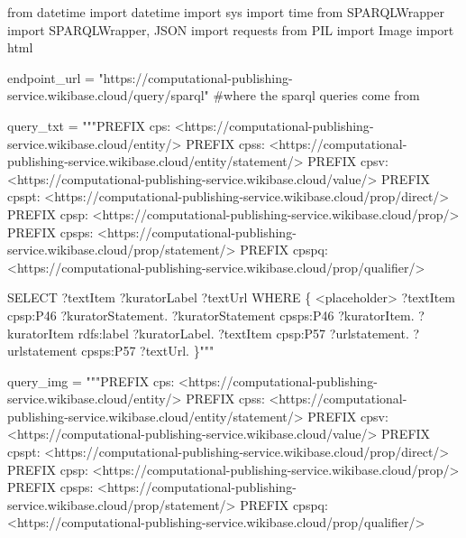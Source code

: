 \documentclass[
  letterpaper,
]{book}
\newenvironment{Shaded}{\begin{snugshade}}{\end{snugshade}}
\newcommand{\CommentTok}[1]{\textcolor[rgb]{0.37,0.37,0.37}{#1}}
\newcommand{\ImportTok}[1]{\textcolor[rgb]{0.00,0.46,0.62}{#1}}
\newcommand{\NormalTok}[1]{\textcolor[rgb]{0.00,0.23,0.31}{#1}}
\newcommand{\OperatorTok}[1]{\textcolor[rgb]{0.37,0.37,0.37}{#1}}
\newcommand{\StringTok}[1]{\textcolor[rgb]{0.13,0.47,0.30}{#1}}
\begin{document}
\begin{Shaded}
\begin{Highlighting}[]
\ImportTok{from}\NormalTok{ datetime }\ImportTok{import}\NormalTok{ datetime}
\ImportTok{import}\NormalTok{ sys}
\ImportTok{import}\NormalTok{ time}
\ImportTok{from}\NormalTok{ SPARQLWrapper }\ImportTok{import}\NormalTok{ SPARQLWrapper, JSON}
\ImportTok{import}\NormalTok{ requests}
\ImportTok{from}\NormalTok{ PIL }\ImportTok{import}\NormalTok{ Image}
\ImportTok{import}\NormalTok{ html}

\NormalTok{endpoint\_url }\OperatorTok{=} \StringTok{"https://computational{-}publishing{-}service.wikibase.cloud/query/sparql"}
\CommentTok{\#where the sparql queries come from}

\NormalTok{query\_txt }\OperatorTok{=} \StringTok{"""PREFIX cps: \textless{}https://computational{-}publishing{-}service.wikibase.cloud/entity/\textgreater{}}
\StringTok{PREFIX cpss: \textless{}https://computational{-}publishing{-}service.wikibase.cloud/entity/statement/\textgreater{}}
\StringTok{PREFIX cpsv: \textless{}https://computational{-}publishing{-}service.wikibase.cloud/value/\textgreater{}}
\StringTok{PREFIX cpspt: \textless{}https://computational{-}publishing{-}service.wikibase.cloud/prop/direct/\textgreater{}}
\StringTok{PREFIX cpsp: \textless{}https://computational{-}publishing{-}service.wikibase.cloud/prop/\textgreater{}}
\StringTok{PREFIX cpsps: \textless{}https://computational{-}publishing{-}service.wikibase.cloud/prop/statement/\textgreater{}}
\StringTok{PREFIX cpspq: \textless{}https://computational{-}publishing{-}service.wikibase.cloud/prop/qualifier/\textgreater{}}

\StringTok{SELECT ?textItem ?kuratorLabel ?textUrl}
\StringTok{WHERE}
\StringTok{\{}
\StringTok{  \textless{}placeholder\textgreater{}}
\StringTok{  ?textItem cpsp:P46 ?kuratorStatement. }
\StringTok{  ?kuratorStatement cpsps:P46 ?kuratorItem.   }
\StringTok{  ?kuratorItem rdfs:label ?kuratorLabel.}
\StringTok{  ?textItem cpsp:P57 ?urlstatement. }
\StringTok{  ?urlstatement cpsps:P57 ?textUrl. }
\StringTok{\}"""}

\NormalTok{query\_img }\OperatorTok{=} \StringTok{"""PREFIX cps: \textless{}https://computational{-}publishing{-}service.wikibase.cloud/entity/\textgreater{}}
\StringTok{PREFIX cpss: \textless{}https://computational{-}publishing{-}service.wikibase.cloud/entity/statement/\textgreater{}}
\StringTok{PREFIX cpsv: \textless{}https://computational{-}publishing{-}service.wikibase.cloud/value/\textgreater{}}
\StringTok{PREFIX cpspt: \textless{}https://computational{-}publishing{-}service.wikibase.cloud/prop/direct/\textgreater{}}
\StringTok{PREFIX cpsp: \textless{}https://computational{-}publishing{-}service.wikibase.cloud/prop/\textgreater{}}
\StringTok{PREFIX cpsps: \textless{}https://computational{-}publishing{-}service.wikibase.cloud/prop/statement/\textgreater{}}
\StringTok{PREFIX cpspq: \textless{}https://computational{-}publishing{-}service.wikibase.cloud/prop/qualifier/\textgreater{}}


\end{Highlighting}
\end{Shaded}
\end{document}
